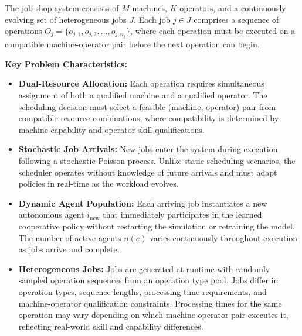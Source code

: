 The job shop system consists of \( M \) machines, \( K \) operators, and a continuously evolving set of heterogeneous jobs \( J \). Each job \( j \in J \) comprises a sequence of operations \( O_j = \{o_{j,1}, o_{j,2}, \ldots, o_{j,n_j}\} \), where each operation must be executed on a compatible machine-operator pair before the next operation can begin.

\textbf{Key Problem Characteristics:}
\begin{itemize}
\item \textbf{Dual-Resource Allocation:}
Each operation requires simultaneous assignment of both a qualified machine and a qualified operator. The scheduling decision must select a feasible (machine, operator) pair from compatible resource combinations, where compatibility is determined by machine capability and operator skill qualifications.

\item \textbf{Stochastic Job Arrivals:}
New jobs enter the system during execution following a stochastic Poisson process. Unlike static scheduling scenarios, the scheduler operates without knowledge of future arrivals and must adapt policies in real-time as the workload evolves.

\item \textbf{Dynamic Agent Population:}
Each arriving job instantiates a new autonomous agent \( i_{\text{new}} \) that immediately participates in the learned cooperative policy without restarting the simulation or retraining the model. The number of active agents \( n(e) \) varies continuously throughout execution as jobs arrive and complete.

\item \textbf{Heterogeneous Jobs:}
Jobs are generated at runtime with randomly sampled operation sequences from an operation type pool. Jobs differ in operation types, sequence lengths, processing time requirements, and machine-operator qualification constraints. Processing times for the same operation may vary depending on which machine-operator pair executes it, reflecting real-world skill and capability differences.


\end{itemize}

